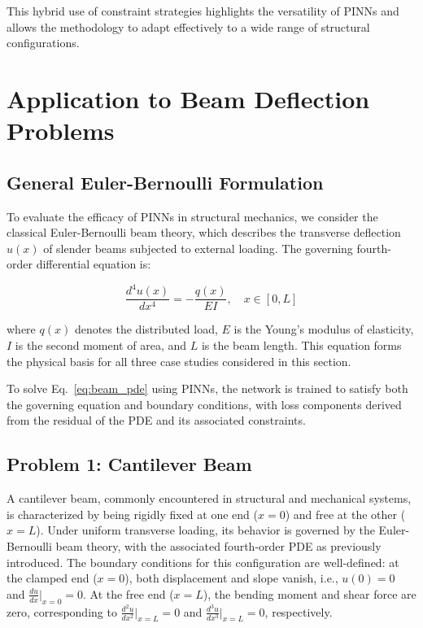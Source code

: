 \documentclass[12pt]{article}
\begin{document}
This hybrid use of constraint strategies highlights the versatility of PINNs and allows the methodology to adapt effectively to a wide range of structural configurations.


\section{Application to Beam Deflection Problems}
\subsection{General Euler-Bernoulli Formulation}

To evaluate the efficacy of PINNs in structural mechanics, we consider the classical Euler-Bernoulli beam theory, which describes the transverse deflection $u(x)$ of slender beams subjected to external loading. The governing fourth-order differential equation is:

\begin{equation}
\frac{d^4 u(x)}{dx^4} = -\frac{q(x)}{EI}, \quad x \in [0, L]
\label{eq:beam_pde}
\end{equation}

where $q(x)$ denotes the distributed load, $E$ is the Young’s modulus of elasticity, $I$ is the second moment of area, and $L$ is the beam length. This equation forms the physical basis for all three case studies considered in this section.

\vspace{0.5em}
To solve Eq.~\eqref{eq:beam_pde} using PINNs, the network is trained to satisfy both the governing equation and boundary conditions, with loss components derived from the residual of the PDE and its associated constraints.

\subsection{Problem 1: Cantilever Beam}

A cantilever beam, commonly encountered in structural and mechanical systems, is characterized by being rigidly fixed at one end ($x=0$) and free at the other ($x=L$). Under uniform transverse loading, its behavior is governed by the Euler-Bernoulli beam theory, with the associated fourth-order PDE as previously introduced. The boundary conditions for this configuration are well-defined: at the clamped end ($x=0$), both displacement and slope vanish, i.e., $u(0) = 0$ and $\frac{du}{dx}|_{x=0} = 0$. At the free end ($x=L$), the bending moment and shear force are zero, corresponding to $\frac{d^2u}{dx^2}|_{x=L} = 0$ and $\frac{d^3u}{dx^3}|_{x=L} = 0$, respectively.
\end{document}
